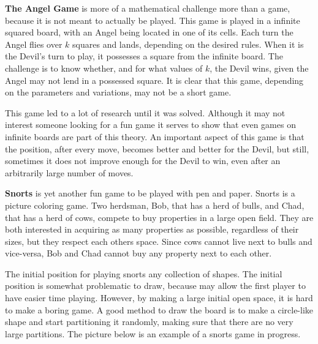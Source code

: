 \textbf{The Angel Game} is more of a mathematical challenge more than a game, because it is not meant to actually be played. This game is played in a infinite squared board, with an Angel being located in one of its cells. Each turn the Angel flies over $k$ squares and lands, depending on the desired rules. When it is the Devil's turn to play, it possesses a square from the infinite board. The challenge is to know whether, and for what values of $k$, the Devil wins, given the Angel may not lend in a possessed square. It is clear that this game, depending on the parameters and variations, may not be a short game.

This game led to a lot of research until it was solved. Although it may not interest someone looking for a fun game it serves to show that even games on infinite boards are part of this theory. An important aspect of this game is that the position, after every move, becomes better and better for the Devil, but still, sometimes it does not improve enough for the Devil to win, even after an arbitrarily large number of moves.

\textbf{Snorts} is yet another fun game to be played with pen and paper. Snorts is a picture coloring game. Two herdsman, Bob, that has a herd of bulls, and Chad, that has a herd of cows, compete to buy properties in a large open field. They are both interested in acquiring as many properties as possible, regardless of their sizes, but they respect each others space. Since cows cannot live next to bulls and vice-versa, Bob and Chad cannot buy any property next to each other.

The initial position for playing snorts any collection of shapes. The initial position is somewhat problematic to draw, because may allow the first player to have easier time playing. However, by making a large initial open space, it is hard to make a boring game. A good method to draw the board is to make a circle-like shape and start partitioning it randomly, making sure that there are no very large partitions. The picture below is an example of a snorts game in progress.

